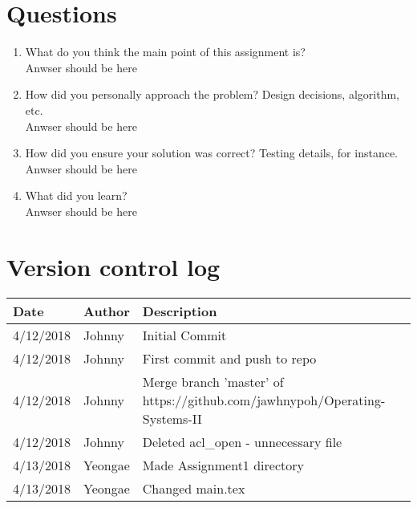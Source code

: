 \documentclass[10pt, letterpaper]{article}
\begin{document}
    
\section{Questions}

    \begin{enumerate}
        \item What do you think the main point of this assignment is? \\
            Anwser should be here
            
        \item How did you personally approach the problem? Design decisions, algorithm, etc. \\
            Anwser should be here
            
        \item How did you ensure your solution was correct? Testing details, for instance. \\
            Anwser should be here
            
        \item What did you learn? \\
            Anwser should be here
            
    \end{enumerate}
 

\section{Version control log}

    \begin{tabular}{l l l }
        \hline
         Date & Author & Description \\
        \hline
         4/12/2018 & Johnny & Initial Commit  \\
         4/12/2018 & Johnny & First commit and push to repo \\
         4/12/2018 & Johnny & Merge branch 'master' of https://github.com/jawhnypoh/Operating-Systems-II \\
         4/12/2018 & Johnny & Deleted acl_open - unnecessary file \\
         4/13/2018 & Yeongae & Made Assignment1 directory \\
         4/13/2018 & Yeongae & Changed main.tex \\
         
         
         
        \hline
    \end{tabular}
\end{document}
